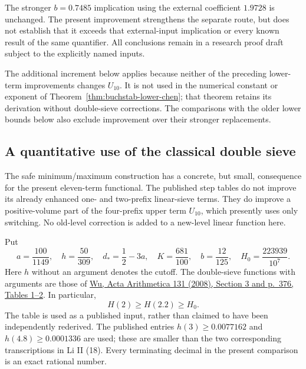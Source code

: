\documentclass[11pt]{article}
\begin{document}
The stronger $b=0.7485$ implication using the external
coefficient $1.9728$ is unchanged. The present improvement
strengthens the separate route, but does not establish that
it exceeds that external-input implication or every known
result of the same quantifier. All conclusions remain in a
research proof draft subject to the explicitly named inputs.

The additional increment below applies because neither of the preceding
lower-term improvements changes $U_{10}$. It is not used in the numerical
constant or exponent of Theorem~\ref{thm:buchstab-lower-chen}; that theorem
retains its derivation without double-sieve corrections. The comparisons
with the older lower bounds below also exclude improvement over their
stronger replacements.


\subsection{A quantitative use of the classical double sieve}
\label{sec:safe-double-sieve-gain}

The safe minimum/maximum construction has a concrete, but small,
consequence for the present eleven-term functional.  The published
step tables do not improve its already enhanced one- and two-prefix
linear-sieve terms.  They do improve a positive-volume part of the
four-prefix upper term $U_{10}$, which presently uses only switching.
No old-level correction is added to a new-level linear function here.

Put
\[
 a=\frac{100}{1149},\quad h=\frac{50}{309},\quad
 d_*=\frac12-3a,\quad K=\frac{681}{100},\quad
 b=\frac{12}{125},\quad H_0=\frac{223939}{10^7}.
\]
Here $h$ without an argument denotes the cutoff.  The double-sieve
functions with arguments are those of
\href{https://www.impan.pl/shop/en/publication/transaction/download/product/81935}
{Wu, Acta Arithmetica 131 (2008), Section 3 and p.~376, Tables 1--2}.
In particular,
\[
 H(2)\ge H(2.2)\ge H_0.
\]
The table is used as a published input, rather than claimed to have
been independently rederived.  The published entries
$h(3)\ge0.0077162$ and $h(4.8)\ge0.0001336$ are used; these are
smaller than the two corresponding transcriptions in Li II (18).
Every terminating decimal in the present comparison is an exact
rational number.
\end{document}

